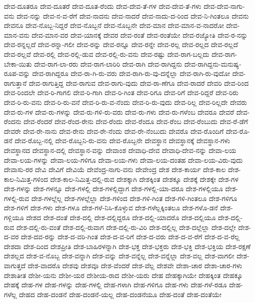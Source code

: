 {ದೇವ-ದೂತರೂ
ದೇವ-ದೂತರೆ
ದೇವ-ದೂತ-ರೆಂದು
ದೇವ-ದೇವ-ತೆ-ಗಳ
ದೇವ-ದೇವ-ತೆ-ಗಳು
ದೇವ-ದೇವ-ನಾಗು-ವನು
ದೇವ-ನನ್ನು
ದೇವ-ನ-ವ-ರೆಗೆ
ದೇವ-ನಾದನು
ದೇವ-ನಾದರೆ
ದೇವ-ನಾದು-ದ-ರಿಂದ
ದೇವ-ನಿ-ಗಿಂತಲೂ
ದೇವನು
ದೇವನೂ
ದೇವ-ನೊಬ್ಬ-ನಿದ್ದರೆ
ದೇವ-ನೊಬ್ಬನೆ
ದೇವ-ನೊಬ್ಬನೇ
ದೇವ-ಮಾನ
ದೇವ-ಮಾನ-ವ-ನಾದರೋ
ದೇವ-ಮಾನ-ವನು
ದೇವ-ಮಾನ-ವರ
ದೇವ-ಯಾನಕ್ಕೆ
ದೇವರ
ದೇವ-ರಂತೆ
ದೇವ-ರಂತೆಯೇ
ದೇವ-ರಜ್ಯೋತಿ
ದೇವ-ರ-ನನ್ನು
ದೇವ-ರನ್ನಲ್ಲದೆ
ದೇವ-ರನ್ನಾ-ಗಲೀ
ದೇವ-ರನ್ನು
ದೇವ-ರನ್ನೂ
ದೇವ-ರನ್ನೇ
ದೇವ-ರಲ್ಲ
ದೇವ-ರಲ್ಲದ
ದೇವ-ರಲ್ಲದೆ
ದೇವ-ರಲ್ಲವೆ
ದೇವ-ರಲ್ಲಿ
ದೇವ-ರಲ್ಲಿ-ಡುವ
ದೇವ-ರಲ್ಲಿ-ರು-ವನು
ದೇವ-ರಷ್ಟು
ದೇವ-ರಾಗ-ಬಲ್ಲದು
ದೇವ-ರಾಗ-ಬೇಕಾ-ಯಿತು
ದೇವ-ರಾಗ-ಲಾ-ರರು
ದೇವ-ರಾಗ-ಲಾರಿರಿ
ದೇವ-ರಾಗಿ
ದೇವ-ರಾಗಿದ್ದನು
ದೇವ-ರಾಗಿದ್ದನು-ಮನುಷ್ಯ-ರೂಪ-ವನ್ನು
ದೇವ-ರಾಗಿದ್ದರೂ
ದೇವ-ರಾ-ಗಿ-ರು-ವರು
ದೇವ-ರಾಗಿ-ರು-ವು-ದನ್ನೆಲ್ಲಾ
ದೇವ-ರಾಗಿ-ರು-ವುದೋ
ದೇವ-ರಾಗುತ್ತಾನೆ
ದೇವ-ರಾಗುತ್ತಿದ್ದ
ದೇವ-ರಾಗುವ
ದೇವ-ರಾಗು-ವುದು
ದೇವ-ರಾ-ಣೆಗೂ
ದೇವ-ರಾದರೆ
ದೇವರಿ
ದೇವ-ರಿಂದ
ದೇವ-ರಿಂದಲೇ
ದೇವ-ರಿ-ಗಾಗಲಿ
ದೇವ-ರಿ-ಗಾಗಿ
ದೇವ-ರಿ-ಗಿಂತ
ದೇವ-ರಿಗೂ
ದೇವ-ರಿಗೆ
ದೇವ-ರಿದ್ದರೆ
ದೇವ-ರಿರು
ದೇವ-ರಿ-ರು-ವನು
ದೇವ-ರಿ-ರು-ವನೆ
ದೇವ-ರಿ-ರು-ವ-ನೆಂದು
ದೇವ-ರಿ-ರು-ವುದು
ದೇವ-ರಿಲ್ಲ
ದೇವ-ರಿಲ್ಲದೇ
ದೇವರು
ದೇವ-ರು-ಗಳ
ದೇವ-ರು-ಗಳನ್ನು
ದೇವ-ರು-ಗಳಿ-ರು-ವರು
ದೇವ-ರು-ಗಳು
ದೇವ-ರು-ಗಳೆಂಬ
ದೇವರೂ
ದೇವರೆ
ದೇವ-ರೆಂದನು
ದೇವ-ರೆಂದರೆ
ದೇವ-ರೆಂದ-ರೇನು
ದೇವ-ರೆಂದು
ದೇವ-ರೆಂದೂ
ದೇವ-ರೆಂಬ
ದೇವ-ರೆಂಬುದು
ದೇವ-ರೆ-ಡೆಗೆ
ದೇವರೇ
ದೇವ-ರೇ-ನಾನು
ದೇವ-ರೇನು
ದೇವ-ರೇ-ನೆಂದು
ದೇವ-ರೇ-ನೆಂಬುದು
ದೇವರೊ
ದೇವ-ರೊಂದಿಗೆ
ದೇವ-ರೊ-ಡನೆ
ದೇವ-ರೊಬ್ಬ-ನಲ್ಲಿ
ದೇವ-ರೊಬ್ಬನಿ-ರು-ವನು
ದೇವ-ರೊಬ್ಬನೇ
ದೇವಸ್ಥಾನ
ದೇವಸ್ಥಾನಕ್ಕೆ
ದೇವಸ್ಥಾನ-ಗಳು
ದೇವಸ್ಥಾನದ
ದೇವಸ್ಥಾನ-ದಲ್ಲಿ
ದೇವಸ್ಥಾನ-ವನ್ನು
ದೇವಾಂಶ
ದೇವಾಧಿ-ದೇವ
ದೇವಾಧಿ-ದೇವ-ನನ್ನು
ದೇವಾ-ಲಯ
ದೇವಾ-ಲಯ-ಗಳನ್ನು
ದೇವಾ-ಲಯ-ಗಳಿಗೂ
ದೇವಾ-ಲಯ-ಗಳು
ದೇವಾ-ಲಯ-ದಂತಹ
ದೇವಾ-ಲಯ-ವಿರು-ವುದು
ದೇವಾಸು-ರರ
ದೇವಿ
ದೇವಿಗೆ
ದೇವಿಯೆ
ದೇವೆಂದ್ರ-ನಾಗು-ವನು
ದೇವೇಂದ್ರ
ದೇಶ
ದೇಶ-ಕಾರ್ಯ
ದೇಶ-ಕಾಲ
ದೇಶ-ಕಾಲ-ನಿಮಿತ್ತ-ಗಳಿಂದ
ದೇಶ-ಕಾಲ-ನಿಮಿತ್ತ-ದಲ್ಲಿ-ರುವ
ದೇಶಕ್ಕಾಗಿ
ದೇಶಕ್ಕಿಂತ
ದೇಶಕ್ಕೂ
ದೇಶಕ್ಕೆ
ದೇಶಕ್ಕೇ
ದೇಶ-ಗಳ
ದೇಶ-ಗಳನ್ನು
ದೇಶ-ಗಳನ್ನೂ
ದೇಶ-ಗಳಲ್ಲಿ
ದೇಶ-ಗಳಲ್ಲಿದ್ದಾಗ
ದೇಶ-ಗಳಲ್ಲಿ-ಯಾ-ದರೂ
ದೇಶ-ಗಳಲ್ಲಿಯೂ
ದೇಶ-ಗಳಲ್ಲಿ-ರುವ
ದೇಶ-ಗಳಲ್ಲೆಲ್ಲ
ದೇಶ-ಗಳಲ್ಲೆಲ್ಲಾ
ದೇಶ-ಗಳಿಂದ
ದೇಶ-ಗಳಿ-ಗಿಂತ
ದೇಶ-ಗಳಿ-ಗಿಂತಲೂ
ದೇಶ-ಗಳಿಗೂ
ದೇಶ-ಗಳಿಗೆ
ದೇಶ-ಗಳು
ದೇಶ-ಗಳೂ
ದೇಶ-ಗಳೆ-ನಿಸಿ-ಕೊಳ್ಳುವ
ದೇಶ-ಗಳೆಲ್ಲಕ್ಕಿಂತಲೂ
ದೇಶ-ಗಳೊ-ಡನೆ
ದೇಶ-ಗಳ್ಲಿಯೂ
ದೇಶದ
ದೇಶ-ದಂತೆ
ದೇಶ-ದಲ್ಲಿ
ದೇಶ-ದಲ್ಲಿದ್ದರೂ
ದೇಶ-ದಲ್ಲಿ-ಯಾದರೊ
ದೇಶ-ದಲ್ಲಿಯೂ
ದೇಶ-ದಲ್ಲಿ-ರುವ
ದೇಶ-ದಲ್ಲಿ-ರು-ವಂತೆ
ದೇಶ-ದಲ್ಲಿ-ರುವಾಗ
ದೇಶ-ದಲ್ಲಿ-ರು-ವಿರಿ
ದೇಶ-ದಲ್ಲಿಲ್ಲ
ದೇಶ-ದಲ್ಲೆಲ್ಲಾ
ದೇಶ-ದಲ್ಲೇ
ದೇಶ-ದ-ವರ
ದೇಶ-ದವ-ರನ್ನು
ದೇಶ-ದ-ವರಿ-ಗಿಂತ
ದೇಶ-ದ-ವ-ರಿಗೆ
ದೇಶ-ದ-ವರು
ದೇಶ-ದ-ವ-ರೆಗೆ
ದೇಶ-ದ-ವ-ರೆಲ್ಲ
ದೇಶದಾ
ದೇಶ-ದಿಂದ
ದೇಶಪ್ರೀತಿ
ದೇಶ-ಬಾಹಿರಳನ್ನಾಗಿ
ದೇಶ-ಭಕ್ತ
ದೇಶ-ಭಕ್ತರು
ದೇಶ-ಭಕ್ತಿ
ದೇಶ-ಭಕ್ತಿಯ
ದೇಶ-ರಕ್ಷಣೆ
ದೇಶಲ್ಲದ
ದೇಶ-ವ-ನೊಬ್ಬ
ದೇಶ-ವನ್ನಾಗಿ
ದೇಶ-ವನ್ನು
ದೇಶ-ವನ್ನೆಲ್ಲ
ದೇಶ-ವನ್ನೆಲ್ಲಾ
ದೇಶ-ವಲ್ಲ
ದೇಶ-ವಾಗಲೀ
ದೇಶ-ವಾಗುತ್ತದೆ
ದೇಶ-ವಾದರೊ
ದೇಶವು
ದೇಶವೂ
ದೇಶ-ವೆಂದರೆ
ದೇಶ-ವೆಲ್ಲ
ದೇಶವೇ
ದೇಶಾ-ಚಾರ
ದೇಶಾ-ಚಾರ-ಗಳು
ದೇಶಾತೀತ
ದೇಶೀ-ಯನು
ದೇಶೀ-ಯರ
ದೇಶೀಯ-ರಾದ
ದೇಶೀ-ಯರು
ದೇಹ
ದೇಹಕ್ಕಾಗಿಯೇ
ದೇಹಕ್ಕಿಂತ
ದೇಹಕ್ಕೂ
ದೇಹಕ್ಕೆ
ದೇಹ-ಗಳ
ದೇಹ-ಗಳನ್ನು
ದೇಹ-ಗಳಲ್ಲಿ
ದೇಹ-ಗಳಾಗಿ
ದೇಹ-ಗಳಿಗೂ
ದೇಹ-ಗಳು
ದೇಹ-ಗಳೆ-ರಡೂ
ದೇಹ-ಗಳೆಲ್ಲ
ದೇಹದ
ದೇಹ-ದಂಡನೆ
ದೇಹ-ದಂಡನೆ-ಯಲ್ಲ
ದೇಹ-ದಂಡನೆಯೂ
ದೇಹ-ದಂತೆ
ದೇಹ-ದಂತೆಯೇ
}
